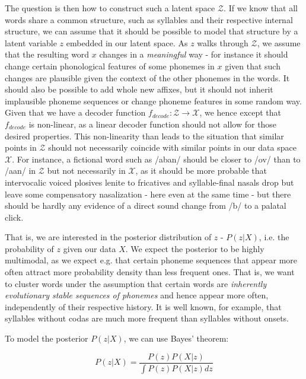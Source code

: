 \documentclass[8pt]{article}
\begin{document}
The question is then how to construct such a latent space $\mathcal{Z}$. If we know that all words share a common structure, such as syllables and their respective internal structure, we can assume that it should be possible to model that structure by a latent variable $z$ embedded in our latent space. As $z$ walks through $\mathcal{Z}$, we assume that the resulting word $x$ changes in a \textit{meaningful} way - for instance it should change certain phonological features of some phonemes in $x$ given that such changes are plausible given the context of the other phonemes in the words. It should also be possible to add whole new affixes, but it should not inherit implausible phoneme sequences or change phoneme features in some random way. Given that we have a decoder function $f_{decode}:\mathcal{Z} \rightarrow \mathcal{X}$, we hence except that $f_{decode}$ is non-linear, as a linear decoder function should not allow for those desired properties. This non-linearity than leads to the situation that similar points in $\mathcal{Z}$ should not necessarily coincide with similar points in our data space $\mathcal{X}$. For instance, a fictional word such as /aban/ should be closer to /ov/ than to /a\textipa{\textdoublebarpipe}an/ in $\mathcal{Z}$ but not necessarily in $\mathcal{X}$, as it should be more probable that intervocalic voiced plosives lenite to fricatives and syllable-final nasals drop but leave some compensatory nasalization - here even at the same time - but there should be hardly any evidence of a direct sound change from /b/ to a palatal click.

That is, we are interested in the posterior distribution of $z$ - $P(z|X)$, i.e. the probability of $z$ given our data $X$. We expect the posterior to be highly multimodal, as we expect e.g. that certain phoneme sequences that appear more often attract more probability density than less frequent ones. That is, we want to cluster words under the assumption that certain words are \textit{inherently evolutionary stable sequences of phonemes} and hence appear more often, independently of their respective history. It is well known, for example, that syllables without codas are much more frequent than syllables without onsets. 

To model the posterior $P(z|X)$, we can use Bayes' theorem:

\begin{equation}
P(z|X) = \frac{P(z)P(X|z)}{\int P(z)P(X|z)dz}
\end{equation}
\end{document}
